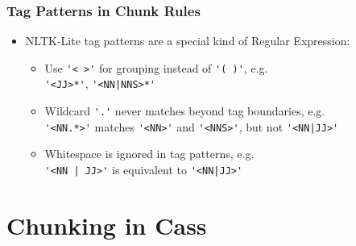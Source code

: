 \begin{frame}[fragile]
  \frametitle{Tag Patterns in Chunk Rules}

  \begin{itemize}
        \item NLTK-Lite tag patterns are a special kind of Regular Expression:
          \begin{itemize}
          \item<1-> Use \verb!'< >'! for grouping instead of \verb!'( )'!, e.g.\\
            \verb!'<JJ>*'!, \verb!'<NN|NNS>*'!
          \item<2-> Wildcard \verb!'.'! never matches beyond tag boundaries, e.g.\\
            \verb!'<NN.*>'! matches \verb!'<NN>'! and \verb!'<NNS>'!, but not \verb!'<NN|JJ>'!
          \item<3-> Whitespace is ignored in tag patterns, e.g.\\
             \verb!'<NN | JJ>'! is equivalent to \verb!'<NN|JJ>'!

          \end{itemize}



  \end{itemize}

\end{frame}






\section{Chunking in Cass}

